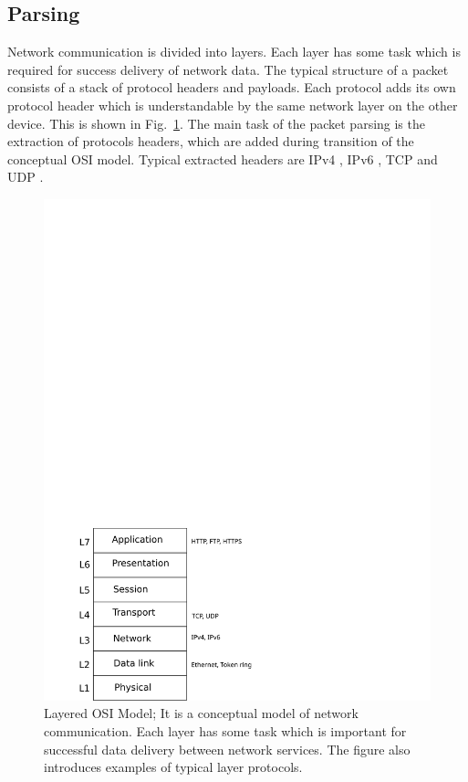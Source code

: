\subsection{Parsing}
\label{sec:parsing}

Network communication is divided into layers. Each layer has some task which is required for success delivery of network data.
The typical structure of a packet consists of a stack of protocol headers and payloads. 
Each protocol adds its own protocol header which is understandable 
by the same network layer on the other device. This is shown in Fig.~\ref{fig:osi}. The main task of the packet parsing is the extraction of 
protocols headers, which are added during transition of the conceptual OSI model. Typical extracted headers are IPv4 \cite{RFCIP},
IPv6 \cite{RFCIP6} , TCP and UDP \cite{RFCTRANS}.  

\begin{figure}[t]
    \centering
    \includegraphics[scale=0.6]{chapters/pic/osi}
    \caption{Layered OSI Model; It is a conceptual model of network communication. Each layer has some task which is important for successful 
        data delivery between network services. The figure also introduces examples of typical layer protocols.}
    \label{fig:osi}
\end{figure}

